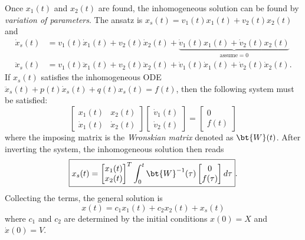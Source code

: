 Once $x_1(t)$ and $x_2(t)$ are found, the inhomogeneous solution can be found by \emph{variation of parameters}. 
The ansatz is $x_s(t) = v_1(t) x_1(t) + v_2(t) x_2(t)$ and 
\begin{equation}
\begin{aligned}
    \dot{x}_s(t) &= v_1(t) \dot{x}_1(t) + v_2(t) \dot{x}_2(t) + \underbrace{\dot{v}_1(t) x_1(t) + \dot{v}_2(t) x_2(t)}_{\textrm{assume} = 0} \\
    \ddot{x}_s(t) &= v_1(t) \ddot{x}_1(t) + v_2(t) \ddot{x}_2(t) + \dot{v}_1(t) \dot{x}_1(t) + \dot{v}_2(t) \dot{x}_2(t).
\end{aligned}
\end{equation}
If $x_s(t)$ satisfies the inhomogeneous ODE $\ddot{x}_s(t) + p(t)\dot{x}_s(t) + q(t)x_s(t) = f(t)$, then the following system must be satisfied:
\begin{equation}
    \begin{bmatrix}
        x_1(t) & x_2(t) \\
        \dot{x}_1(t) & \dot{x}_2(t)
    \end{bmatrix} \begin{bmatrix}
        \dot{v}_1(t) \\ \dot{v}_2(t)
    \end{bmatrix} = \begin{bmatrix}
        0 \\ f(t)
    \end{bmatrix}
\end{equation}
where the imposing matrix is the \emph{Wronskian matrix} denoted as $\bt{W}(t)$. 
After inverting the system, the inhomogeneous solution then reads
\begin{equation}
    \boxed{x_s(t) = \begin{bmatrix}
        x_1(t) \\ x_2(t) 
    \end{bmatrix}^T \int_0^t \bt{W}^{-1}(\tau) \begin{bmatrix}
        0 \\ f(\tau)
    \end{bmatrix} d\tau}.
\end{equation}
Collecting the terms, the general solution is 
\begin{equation}
    x(t) = c_1 x_1(t) + c_2 x_2(t) + x_s(t)
\end{equation}
where $c_1$ and $c_2$ are determined by the initial conditions $x(0) = X$ and $\dot{x}(0) = V$.

